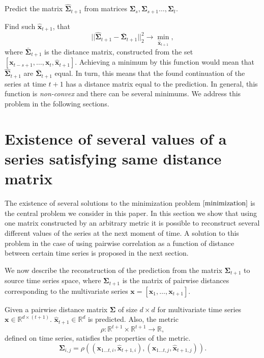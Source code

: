 \documentclass[12pt]{article}
\begin{document}
Predict the matrix $\hat{\mathbf{\Sigma}}_{t+1}$ from matrices $\mathbf{\Sigma}_s, \mathbf{\Sigma}_{s+1} \ldots, \mathbf{\Sigma}_{t}$.

Find such $\mathbf{\hat{x}}_{t+1}$, that
\[ ||\hat{\mathbf{\Sigma}}_{t+1} - \bar{\mathbf{\Sigma}}_{t+1}||_2^2 \rightarrow \min_{\mathbf{\hat{x}}_{t+1}}, \tag{1} \label{minimization}\] 
where $\bar{\mathbf{\Sigma}}_{t+1}$ is the distance matrix, constructed from the set $[\mathbf{x}_{t-s+1}, \ldots, \mathbf{x}_{t}, \mathbf{\hat{x}}_{t+1}]$. Achieving a minimum by this function would mean that $\hat{\mathbf{\Sigma}}_{t+1}$ are $\bar{\mathbf{\Sigma}}_{t+1}$ equal. In turn, this means that the found continuation of the series at time $t+1$ has a distance matrix equal to the prediction. In general, this function is \emph{non-convex} and there can be several minimums. We address this problem in the following sections.

\section{Existence of several values of a series satisfying same distance matrix}

The existence of several solutions to the minimization problem $\eqref{minimization}$ is the central problem we consider in this paper. In this section we show that using one matrix constructed by an arbitrary metric it is possible to reconstruct several different values of the series at the next moment of time. A solution to this problem in the case of using pairwise correlation as a function of distance between certain time series is proposed in the next section.

We now describe the reconstruction of the prediction from the matrix $\mathbf{\Sigma}_{t+1}$ to source time series space, where $\mathbf{\Sigma}_{t+1}$ is the matrix of pairwise distances corresponding to the multivariate series $\mathbf{x}=[\mathbf{x}_1, \ldots, \mathbf{x}_{t+1}]$.

Given a pairwise distance matrix $\mathbf{\Sigma}$ of size $d \times d$ for multivariate time series $\mathbf{x} \in \mathbb{R}^{d \times (t+1)}$. $\hat{\mathbf{x}}_{t+1} \in \mathbb{R}^d$ is predicted. Also, the metric \[ \rho : \mathbb{R}^{t+1} \times \mathbb{R}^{t+1} \rightarrow \mathbb{R}, \] defined on time series, satisfies the properties of the metric.
\[\mathbf{\Sigma}_{i,j} = \rho((\mathbf{x}_{1 \ldots t, i}, \hat{\mathbf{x}}_{t+1, i}), (\mathbf{x}_{1 \ldots t, j}, \hat{\mathbf{x}}_{t+1, j})).\]
\end{document}
